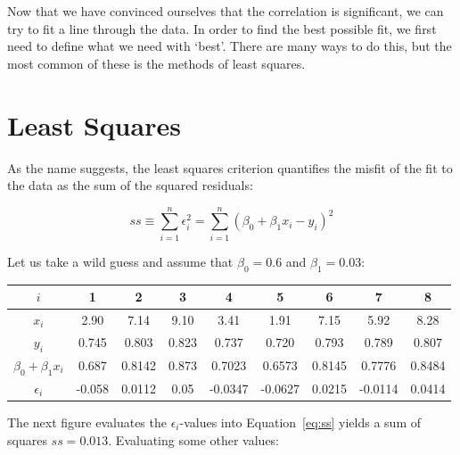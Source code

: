 Now that we have convinced ourselves that the correlation is
significant, we can try to fit a line through the data. In order to
find the best possible fit, we first need to define what we need with
`best'. There are many ways to do this, but the most common of these
is the methods of least squares.

\section{Least Squares}
\label{sec:leastsquares}

As the name suggests, the least squares criterion quantifies the
misfit of the fit to the data as the sum of the squared residuals:

\begin{equation}
ss \equiv \sum_{i=1}^{n} \epsilon_i^2 = \sum_{i=1}^{n} (\beta_0 + \beta_1 x_i - y_i)^2
\label{eq:ss}
\end{equation}

Let us take a wild guess and assume that $\beta_0=0.6$ and
$\beta_1=0.03$:

\begin{center}
  \begin{tabular}{c|cccccccc}
    $i$ & 1 & 2 & 3 & 4 & 5 & 6 & 7 & 8 \\ \hline
    $x_i$ & 2.90 & 7.14 & 9.10 & 3.41 & 1.91 & 7.15 & 5.92 & 8.28 \\
    $y_i$ & 0.745 & 0.803 & 0.823 & 0.737 & 0.720 & 0.793 & 0.789 & 0.807 \\ \hline
    $\beta_0 + \beta_1 x_i$ & 0.687 & 0.8142 & 0.873 & 0.7023 &
    0.6573 & 0.8145 & 0.7776 & 0.8484 \\
    $\epsilon_i$ & -0.058 & 0.0112 & 0.05 & -0.0347 & -0.0627 &
    0.0215 & -0.0114 & 0.0414
  \end{tabular}
\end{center}

The next figure evaluates the $\epsilon_i$-values into
Equation~\ref{eq:ss} yields a sum of squares $ss=0.013$. Evaluating
some other values:

